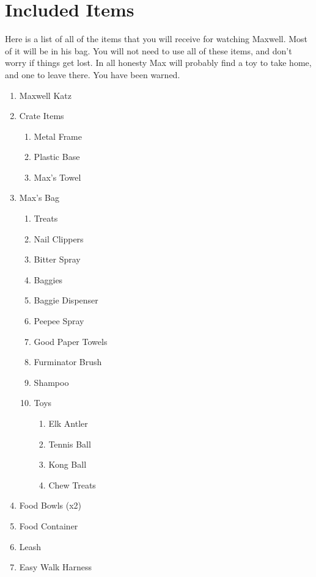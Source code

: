 \documentclass[pdftex,12pt]{article}
\begin{document}
\bigskip

\clearpage
\newpage
\section{Included Items}

Here is a list of all of the items that you will receive for watching Maxwell.
Most of it will be in his bag. You will not need to use all of these items, and
don't worry if things get lost. In all honesty Max will probably find a toy to
take home, and one to leave there. You have been warned.

\begin{enumerate}\label{itm:included_items}
    \item Maxwell Katz
    \item Crate Items
        \begin{enumerate}
            \item Metal Frame
            \item Plastic Base
            \item Max's Towel
        \end{enumerate}
    \item Max's Bag
        \begin{enumerate}
            \item Treats
            \item Nail Clippers
            \item Bitter Spray
            \item Baggies
            \item Baggie Dispenser
            \item Peepee Spray
            \item Good Paper Towels
            \item Furminator Brush
            \item Shampoo
            \item Toys
                \begin{enumerate}
                    \item Elk Antler
                    \item Tennis Ball
                    \item Kong Ball
                    \item Chew Treats
                \end{enumerate}
        \end{enumerate}
    \item Food Bowls (x2)
    \item Food Container
    \item Leash
    \item Easy Walk Harness
\end{enumerate}
\end{document}
